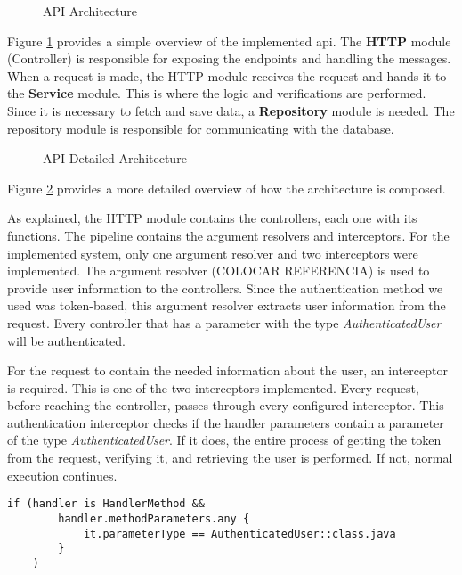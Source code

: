 \begin{figure}[H]
    \centering
    
    \caption{API Architecture}
    \label{fig:api_architecture}
\end{figure}

Figure \ref{fig:api_architecture} provides a simple overview of the implemented \acs{api}. The \textbf{HTTP} module (Controller) is responsible for exposing the endpoints and handling the messages. When a request is made, the HTTP module receives the request and hands it to the \textbf{Service} module. This is where the logic and verifications are performed. Since it is necessary to fetch and save data, a \textbf{Repository} module is needed. The repository module is responsible for communicating with the database.

\vspace{3mm}

\begin{figure}[H]
    \centering
    
    \caption{API Detailed Architecture}
    \label{fig:api_detailed_architecture}
\end{figure}

Figure \ref{fig:api_detailed_architecture} provides a more detailed overview of how the architecture is composed. 

As explained, the HTTP module contains the controllers, each one with its functions. The pipeline contains the argument resolvers and interceptors. For the implemented system, only one argument resolver and two interceptors were implemented. The argument resolver (COLOCAR REFERENCIA) is used to provide user information to the controllers. Since the authentication method we used was token-based, this argument resolver extracts user information from the request. Every controller that has a parameter with the type \textit{AuthenticatedUser} will be authenticated. 

For the request to contain the needed information about the user, an interceptor is required. This is one of the two interceptors implemented. Every request, before reaching the controller, passes through every configured interceptor. This authentication interceptor checks if the handler parameters contain a parameter of the type \textit{AuthenticatedUser}. If it does, the entire process of getting the token from the request, verifying it, and retrieving the user is performed. If not, normal execution continues.
\begin{center}
    \begin{lstlisting}[caption={Type AuthenticatedUser verification example}]
    if (handler is HandlerMethod &&
        handler.methodParameters.any {
            it.parameterType == AuthenticatedUser::class.java
        }
    )
    \end{lstlisting}
\end{center}


